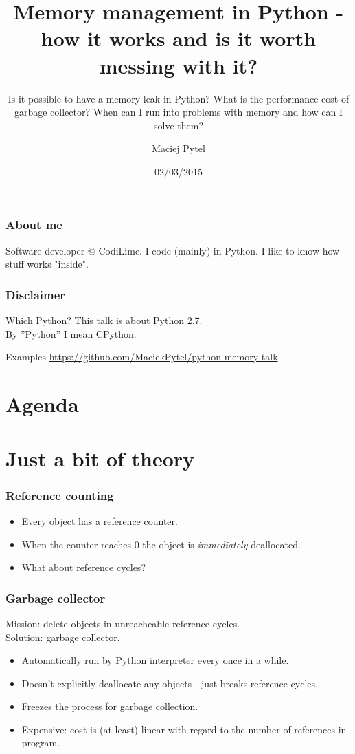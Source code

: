 \documentclass{beamer}
\title[Memory management in Python]{Memory management in Python - how it works and is it worth messing with it?}
\subtitle{Is it possible to have a memory leak in Python? What is the performance cost of garbage collector? When can I run into problems with memory and how can I solve them?}
\author[Maciej Pytel]{Maciej Pytel}
\date{02/03/2015}
\begin{document}
\begin{frame}
  \begin{titlepage}
  \end{titlepage}
\end{frame}

\begin{frame}
    \frametitle{About me}
    Software developer @ CodiLime. I code (mainly) in Python. I like to know how stuff works "inside".
\end{frame}

\begin{frame}
    \frametitle{Disclaimer}
    \begin{block}{Which Python?}
        This talk is about Python 2.7.\\
        By ''Python'' I mean CPython.
    \end{block}
    \begin{block}{Examples}
        \url{https://github.com/MaciekPytel/python-memory-talk}
    \end{block}
\end{frame}

\section*{Agenda}
    \begin{frame}
      \tableofcontents
    \end{frame}

\setcounter{section}{0}
\section{Just a bit of theory}
\frame\sectionpage
    \begin{frame}
        \frametitle{Reference counting}
        \begin{itemize}
            \item Every object has a reference counter.
            \item When the counter reaches 0 the object is \textit{immediately} deallocated.
            \item What about reference cycles?
        \end{itemize}
    \end{frame}

    \begin{frame}
        \frametitle{Garbage collector}
        Mission: delete objects in unreacheable reference cycles.\\
        Solution: garbage collector.
        \begin{itemize}
            \item Automatically run by Python interpreter every once in a while.
            \item Doesn't explicitly deallocate any objects - just breaks reference cycles.
            \item Freezes the process for garbage collection.
            \item Expensive: cost is (at least) linear with regard to the number of references in program.
        \end{itemize}
    \end{frame}
\end{document}
